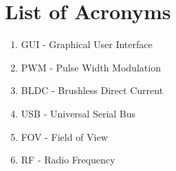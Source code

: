 \section{List of Acronyms}
\begin{enumerate}
	\item GUI - Graphical User Interface
	\item PWM - Pulse Width Modulation
	\item BLDC - Brushless Direct Current
	\item USB - Universal Serial Bus
	\item FOV - Field of View
	\item RF - Radio Frequency
\end{enumerate}

